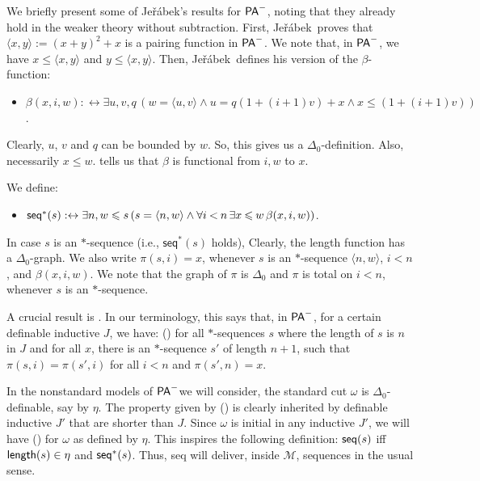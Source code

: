 \documentclass{amsart}
\renewcommand{\iff}{\leftrightarrow}
\renewcommand{\leq}{\leqslant}
\newcommand{\mc}[1]{\mathcal #1}
\newcommand{\tupel}[1]{{\langle #1 \rangle}}
\newcommand{\bles}{\mathbin{<}}
\newcommand{\bleq}{\mathbin{\leq}}
\newcommand{\pam}{\ensuremath{{\sf PA}^{-}}}
\newcommand{\jer}{Je\v{r}\'abek}
\begin{document}
We briefly present some of \jer's results for \pam, noting that they already hold in the weaker theory without subtraction.
First, \jer\ proves that $\tupel{x,y} := (x+y)^2+x$ is a pairing function in \pam.
We note that, in \pam, we have $x\leq \tupel{x,y}$ and $y \leq \tupel{x,y}$.
Then, \jer\ defines his version of the $\beta$-function:
\begin{itemize}
    \item {\small
   $\beta(x,i,w) :\iff \exists u,v,q\, (w=\tupel{u,v} \wedge u= q(1+(i+1)v)+x \wedge x \leq (1+(i+1)v))$. 
   }
\end{itemize}
Clearly, $u$, $v$ and $q$ can be bounded by $w$. So, this gives us a $\Delta_0$-definition.
Also, necessarily $x \leq w$.
\cite[Lemma 4(iii)]{jera:sequ12} tells us that $\beta$ is functional from $i,w$ to $x$.

We define:
\begin{itemize}
    \item 
    ${\sf seq}^\ast(s) :\iff \exists n,w \leq s\, (s = \tupel{n,w} \wedge \forall i \bles n \,\exists x\bleq w  \, \beta(x,i,w))$. 
\end{itemize}
In case $s$ is an $\ast$-sequence (i.e., $\mathsf{seq}^\ast(s)$ holds), 
Clearly, the length function has a $\Delta_0$-graph. We also write $\pi(s,i) =x$, whenever $s$ is an $\ast$-sequence $\tupel{n,w}$, $i<n$, and
$\beta(x,i,w)$. We note that the graph of $\pi$ is $\Delta_0$ and $\pi$ is total on $i<n$, whenever $s$ is an $\ast$-sequence.

A crucial result is \cite[Lemma 8]{jera:sequ12}. In our terminology, this says that, in \pam, for a certain definable inductive $J$, we have: (\dag)
for all $\ast$-sequences $s$ where the length of $s$ is $n$ in $J$ and for all $x$, there is an $\ast$-sequence $s'$ of length $n+1$, such that
$\pi(s,i)=\pi(s',i)$ for all $i<n$ and $\pi(s',n)=x$. 

In the nonstandard models of \pam we will consider, the standard cut $\omega$ is $\Delta_0$-definable, say by $\eta$. The property given by (\dag) is clearly inherited by definable inductive $J'$
that are shorter than $J$. Since $\omega$ is initial in any inductive $J'$, we will have (\dag) for $\omega$ as defined by $\eta$.
This inspires the following definition: ${\sf seq}(s)$ iff ${\sf length}(s) \in \eta$ and  ${\sf seq}^\ast(s)$.
Thus, {\sf seq} will deliver, inside $\mc M$, sequences in the usual sense.
\end{document}
